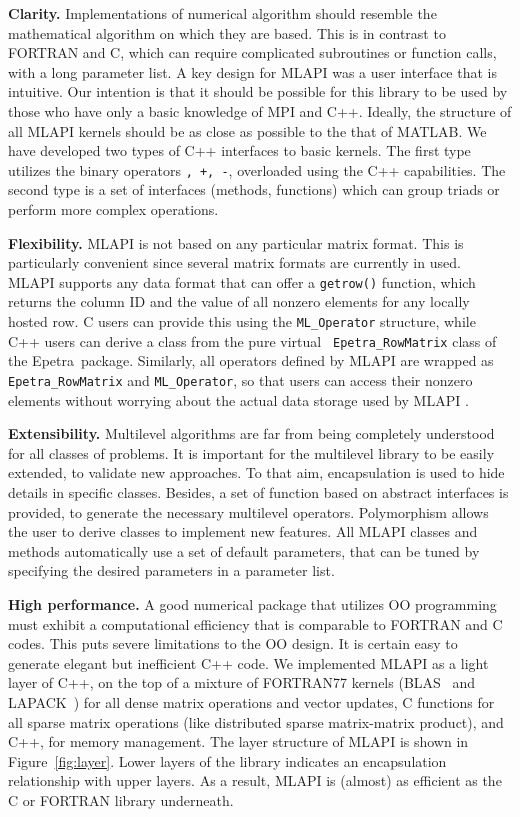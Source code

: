 \documentclass{article}[11pt]
\newcommand{\epetra}  {{\sc Epetra}}
\newcommand{\MLAPI}  {{\sc MLAPI }}
\begin{document}
\noindent
{\bf Clarity.} Implementations of numerical algorithm should resemble
the mathematical algorithm on which they are based. This is in contrast to
FORTRAN and C, which can require complicated subroutines or function calls,
  with a long parameter list.
A key design for \MLAPI was a user interface that is
intuitive. Our intention is that it should be possible for this
library to be used by those who have only a basic knowledge of MPI and C++.
Ideally, the structure of all \MLAPI kernels should be as close as possible to
the that of MATLAB. We have developed two types of C++ interfaces to basic
kernels. The first type utilizes the binary operators {\tt *, +, -},
  overloaded using the C++ capabilities. The second type is a set of
  interfaces (methods, functions) which can group triads or perform more
  complex operations.

\bigskip

\noindent
{\bf Flexibility.} \MLAPI is not based on any particular matrix format. This
is particularly convenient since several matrix formats are currently in used.
\MLAPI supports any data format that can offer a {\tt getrow()} function,
  which returns the column ID and the value of all nonzero elements for any
  locally hosted row. C users can provide this using the {\tt ML\_Operator}
  structure, while C++ users can derive a class from the pure virtual {\tt
    Epetra\_RowMatrix} class of the \epetra\ package.  Similarly, all operators defined by \MLAPI are
    wrapped as {\tt Epetra\_RowMatrix} and {\tt ML\_Operator}, so that users
    can access their nonzero elements without worrying about the actual data
    storage used by \MLAPI.
\bigskip

\noindent
{\bf Extensibility.} Multilevel algorithms are far from being completely
understood for all classes of problems. It is important for the multilevel
library to be easily extended, to validate new approaches. To that aim,
encapsulation is used to hide details in
specific classes. Besides, a set of function based on abstract interfaces
is provided, to generate the necessary multilevel operators. Polymorphism
allows the user to derive classes to implement new features.
All \MLAPI classes and methods automatically use a set of
default parameters, that can be tuned by specifying the
desired parameters in a parameter list.

\bigskip

\noindent
{\bf High performance.} A good numerical package that utilizes
OO programming must exhibit a computational efficiency that is comparable to FORTRAN and
C codes. This puts severe limitations to the OO design. It is certain easy to
generate elegant but inefficient C++ code. 
We implemented \MLAPI as a light layer of
C++, on the top of
a mixture of FORTRAN77 kernels (BLAS~\cite{dongarra90set} and
                                LAPACK~\cite{demmel89lapack}) 
for all dense matrix
operations and vector updates, C functions for all sparse matrix operations
(like distributed sparse matrix-matrix product), and C++, for memory
management. The layer
structure of \MLAPI is shown in Figure~\ref{fig:layer}. Lower layers of the
library indicates an encapsulation relationship with upper layers. As a
result, \MLAPI is (almost) as
efficient as the C or FORTRAN library underneath.
\end{document}
